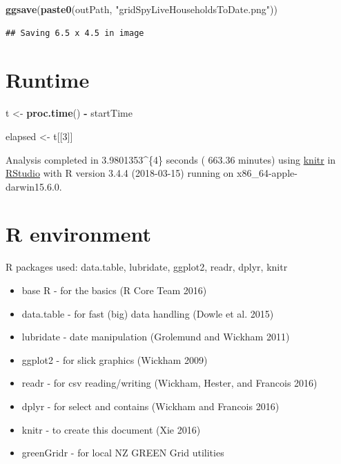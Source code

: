 \documentclass[]{article}
\newenvironment{Shaded}{\begin{snugshade}}{\end{snugshade}}
\newcommand{\KeywordTok}[1]{\textcolor[rgb]{0.13,0.29,0.53}{\textbf{#1}}}
\newcommand{\DecValTok}[1]{\textcolor[rgb]{0.00,0.00,0.81}{#1}}
\newcommand{\StringTok}[1]{\textcolor[rgb]{0.31,0.60,0.02}{#1}}
\newcommand{\OperatorTok}[1]{\textcolor[rgb]{0.81,0.36,0.00}{\textbf{#1}}}
\newcommand{\NormalTok}[1]{#1}
\providecommand{\tightlist}{%
  \setlength{\itemsep}{0pt}\setlength{\parskip}{0pt}}
\begin{document}
\begin{Shaded}
\begin{Highlighting}[]
\KeywordTok{ggsave}\NormalTok{(}\KeywordTok{paste0}\NormalTok{(outPath, }\StringTok{"gridSpyLiveHouseholdsToDate.png"}\NormalTok{))}
\end{Highlighting}
\end{Shaded}

\begin{verbatim}
## Saving 6.5 x 4.5 in image
\end{verbatim}

\section{Runtime}\label{runtime}

\begin{Shaded}
\begin{Highlighting}[]
\NormalTok{t <-}\StringTok{ }\KeywordTok{proc.time}\NormalTok{() }\OperatorTok{-}\StringTok{ }\NormalTok{startTime}

\NormalTok{elapsed <-}\StringTok{ }\NormalTok{t[[}\DecValTok{3}\NormalTok{]]}
\end{Highlighting}
\end{Shaded}

Analysis completed in 3.9801353\^{}\{4\} seconds ( 663.36
minutes) using \href{https://cran.r-project.org/package=knitr}{knitr} in
\href{http://www.rstudio.com}{RStudio} with R version 3.4.4 (2018-03-15)
running on x86\_64-apple-darwin15.6.0.

\section{R environment}\label{r-environment}

R packages used: data.table, lubridate, ggplot2, readr, dplyr, knitr

\begin{itemize}
\tightlist
\item
  base R - for the basics (R Core Team 2016)
\item
  data.table - for fast (big) data handling (Dowle et al. 2015)
\item
  lubridate - date manipulation (Grolemund and Wickham 2011)
\item
  ggplot2 - for slick graphics (Wickham 2009)
\item
  readr - for csv reading/writing (Wickham, Hester, and Francois 2016)
\item
  dplyr - for select and contains (Wickham and Francois 2016)
\item
  knitr - to create this document (Xie 2016)
\item
  greenGridr - for local NZ GREEN Grid utilities
\end{itemize}
\end{document}
